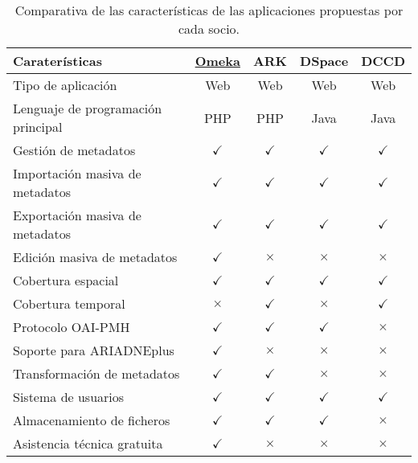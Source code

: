 \begin{table}[H]\label{tabla:comparativa}
\caption{Comparativa de las características de las aplicaciones propuestas por cada socio.}
\centering
\begin{tabular}{@{}lcccc@{}}
\toprule
Caraterísticas & \underline{Omeka} & ARK & DSpace & DCCD \tabularnewline
\midrule
Tipo de aplicación & Web & Web & Web & Web\tabularnewline
Lenguaje de programación principal & PHP & PHP & Java &
Java\tabularnewline
Gestión de metadatos & \cellcolor{green!25} {$\checkmark$} & \cellcolor{green!25} {$\checkmark$} & \cellcolor{green!25} {$\checkmark$} & \cellcolor{green!25} {$\checkmark$}\tabularnewline
Importación masiva de metadatos & \cellcolor{green!25} {$\checkmark$} & \cellcolor{green!25} {$\checkmark$} & \cellcolor{green!25} {$\checkmark$} & \cellcolor{green!25} {$\checkmark$}\tabularnewline
Exportación masiva de metadatos & \cellcolor{green!25} {$\checkmark$} & \cellcolor{green!25} {$\checkmark$} & \cellcolor{green!25} {$\checkmark$} & \cellcolor{green!25} {$\checkmark$}\tabularnewline
Edición masiva de metadatos & \cellcolor{green!25} {$\checkmark$} & \cellcolor{red!25} {$\times$} & \cellcolor{red!25} {$\times$} & \cellcolor{red!25} {$\times$}\tabularnewline
Cobertura espacial & \cellcolor{green!25} {$\checkmark$} & \cellcolor{green!25} {$\checkmark$} & \cellcolor{green!25} {$\checkmark$} & \cellcolor{green!25} {$\checkmark$}\tabularnewline
Cobertura temporal & \cellcolor{red!25} {$\times$} & \cellcolor{green!25} {$\checkmark$} & \cellcolor{red!25} {$\times$} & \cellcolor{green!25} {$\checkmark$}\tabularnewline
Protocolo OAI-PMH & \cellcolor{green!25} {$\checkmark$} & \cellcolor{green!25} {$\checkmark$} & \cellcolor{green!25} {$\checkmark$} & \cellcolor{red!25} {$\times$}\tabularnewline
Soporte para ARIADNEplus & \cellcolor{green!25} {$\checkmark$} & \cellcolor{red!25} {$\times$} & \cellcolor{red!25} {$\times$} &
\cellcolor{red!25} {$\times$}\tabularnewline
Transformación de metadatos & \cellcolor{green!25} {$\checkmark$} & \cellcolor{green!25} {$\checkmark$} & \cellcolor{red!25} {$\times$} &
\cellcolor{red!25} {$\times$}\tabularnewline
Sistema de usuarios & \cellcolor{green!25} {$\checkmark$} & \cellcolor{green!25} {$\checkmark$} & \cellcolor{green!25} {$\checkmark$} & \cellcolor{green!25} {$\checkmark$}\tabularnewline
Almacenamiento de ficheros & \cellcolor{green!25} {$\checkmark$} & \cellcolor{green!25} {$\checkmark$} & \cellcolor{green!25} {$\checkmark$} & \cellcolor{red!25} {$\times$}\tabularnewline
Asistencia técnica gratuita & \cellcolor{green!25} {$\checkmark$} & \cellcolor{red!25} {$\times$} & \cellcolor{red!25} {$\times$} & \cellcolor{red!25} {$\times$}\tabularnewline

\end{tabular}
\end{table}
